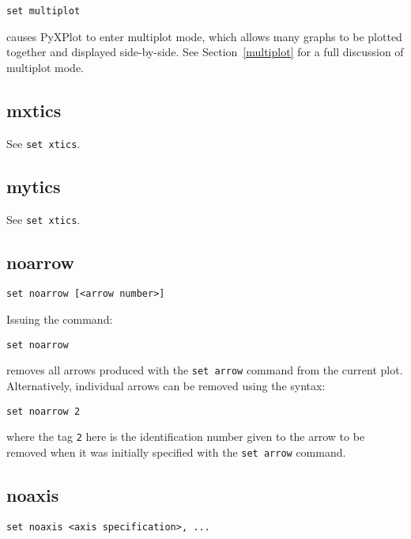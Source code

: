\begin{verbatim}
set multiplot
\end{verbatim}

\noindent causes PyXPlot to enter multiplot mode, which allows many graphs to
be plotted together and displayed side-by-side. See Section~\ref{multiplot} for
a full discussion of multiplot mode.

\subsection{mxtics}

See {\tt set xtics}.

\subsection{mytics}

See {\tt set xtics}.

\subsection{noarrow}

\begin{verbatim}
set noarrow [<arrow number>]
\end{verbatim}

Issuing the command:

\begin{verbatim}
set noarrow
\end{verbatim}

\noindent removes all arrows produced with the {\tt set arrow} command from the current
plot. Alternatively, individual arrows can be removed using the syntax:

\begin{verbatim}
set noarrow 2
\end{verbatim}

\noindent where the tag {\tt 2} here is the identification number given to
the arrow to be removed when it was initially specified with the {\tt set arrow}
command.

\subsection{noaxis}

\begin{verbatim}
set noaxis <axis specification>, ...
\end{verbatim}

